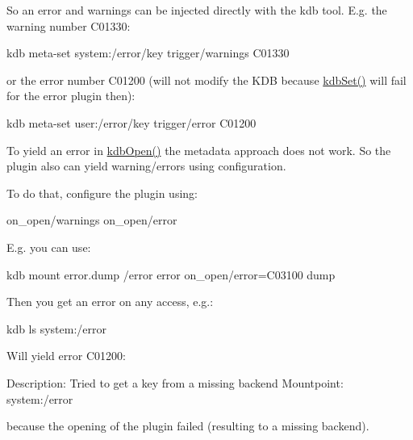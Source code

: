 So an error and warnings can be injected directly with the kdb tool. E.\+g. the warning number C01330\+:


\begin{DoxyCode}
kdb meta-set system:/error/key trigger/warnings C01330
\end{DoxyCode}


or the error number C01200 (will not modify the K\+DB because {\ttfamily \hyperlink{group__kdb_ga11436b058408f83d303ca5e996832bcf}{kdb\+Set()}} will fail for the error plugin then)\+:


\begin{DoxyCode}
kdb meta-set user:/error/key trigger/error C01200
\end{DoxyCode}


To yield an error in \hyperlink{group__kdb_ga844e1299a84c3fbf1d3a905c5c893ba5}{kdb\+Open()} the metadata approach does not work. So the plugin also can yield warning/errors using configuration.

To do that, configure the plugin using\+:


\begin{DoxyCode}
on\_open/warnings
on\_open/error
\end{DoxyCode}


E.\+g. you can use\+:


\begin{DoxyCode}
kdb mount error.dump /error error on\_open/error=C03100 dump
\end{DoxyCode}


Then you get an error on any access, e.\+g.\+:


\begin{DoxyCode}
kdb ls system:/error
\end{DoxyCode}


Will yield error C01200\+:


\begin{DoxyCode}
Description: Tried to get a key from a missing backend
Mountpoint: system:/error
\end{DoxyCode}


because the opening of the plugin failed (resulting to a missing backend). 